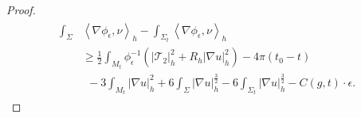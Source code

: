 \documentclass[letter]{amsart}
\theoremstyle{definition}
\theoremstyle{remark}
\begin{document}
\begin{proof}

\begin{align}\label{lap-ineq2}
	\begin{split}
		\int_{\Sigma} &\left<\nabla \phi _\epsilon , \nu  \right>_h - \int_{\Sigma_t} \left<\nabla \phi _\epsilon , \nu  \right>_h\\									   &\geq \frac{1}{2} \int_{M_t} \phi _\epsilon ^{-1}\left( |\mathcal{T}_2|_h^2 + R_h |\nabla u|_h^2 \right) - 4 \pi (t_0 -t) \\
									   &\ \ -3 \int_{M_t} |\nabla u|_h^{2} + 6 \int_{\Sigma } |\nabla u|_h^{\frac{3}{2}} - 6 \int_{\Sigma _t} |\nabla u|_h^{\frac{3}{2}}- C(g, t) \cdot \epsilon.
	\end{split}
\end{align}

\end{proof}
\end{document}

